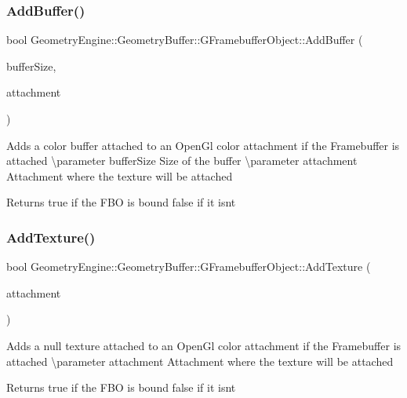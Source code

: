 \subsubsection{\texorpdfstring{AddBuffer()}{AddBuffer()}}
{\footnotesize\ttfamily bool Geometry\+Engine\+::\+Geometry\+Buffer\+::\+G\+Framebuffer\+Object\+::\+Add\+Buffer (\begin{DoxyParamCaption}\item[{const Q\+Vector2D \&}]{buffer\+Size,  }\item[{G\+Framebuffer\+Commons\+::\+G\+\_\+\+C\+O\+L\+O\+R\+\_\+\+A\+T\+T\+A\+C\+H\+M\+E\+N\+TS}]{attachment }\end{DoxyParamCaption})}

Adds a color buffer attached to an Open\+Gl color attachment if the Framebuffer is attached \textbackslash{}parameter buffer\+Size Size of the buffer \textbackslash{}parameter attachment Attachment where the texture will be attached \begin{DoxyReturn}{Returns}
true if the F\+BO is bound false if it isn\textquotesingle{}t 
\end{DoxyReturn}
\mbox{\label{class_geometry_engine_1_1_geometry_buffer_1_1_g_framebuffer_object_a74233a30be93e8b25f3a957629e47f6e}} 
\subsubsection{\texorpdfstring{AddTexture()}{AddTexture()}\hspace{0.1cm}{\footnotesize\ttfamily [1/3]}}
{\footnotesize\ttfamily bool Geometry\+Engine\+::\+Geometry\+Buffer\+::\+G\+Framebuffer\+Object\+::\+Add\+Texture (\begin{DoxyParamCaption}\item[{G\+Framebuffer\+Commons\+::\+G\+\_\+\+C\+O\+L\+O\+R\+\_\+\+A\+T\+T\+A\+C\+H\+M\+E\+N\+TS}]{attachment }\end{DoxyParamCaption})}

Adds a null texture attached to an Open\+Gl color attachment if the Framebuffer is attached \textbackslash{}parameter attachment Attachment where the texture will be attached \begin{DoxyReturn}{Returns}
true if the F\+BO is bound false if it isn\textquotesingle{}t 
\end{DoxyReturn}
\mbox{\label{class_geometry_engine_1_1_geometry_buffer_1_1_g_framebuffer_object_a2df48d160d1fe45479ec0bbd8585e07c}} 
